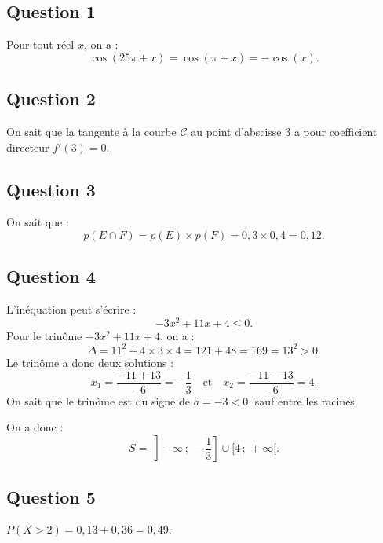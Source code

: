 \subsection*{Question 1}

Pour tout réel \(x\), on a :
\[
\cos(25\pi + x) = \cos(\pi + x) = - \cos(x).
\]

\subsection*{Question 2}

On sait que la tangente à la courbe \(\mathcal{C}\) au point d'abscisse 3 a pour coefficient directeur \(f'(3) = 0\).

\subsection*{Question 3}

On sait que :
\[
p(E \cap F) = p(E) \times p(F) = 0{,}3 \times 0{,}4 = 0{,}12.
\]

\subsection*{Question 4}

L'inéquation peut s'écrire :
\[
-3x^2 + 11x + 4 \leqslant 0.
\]
Pour le trinôme \(-3x^2 + 11x + 4\), on a :
\[
\Delta = 11^2 + 4 \times 3 \times 4 = 121 + 48 = 169 = 13^2 > 0.
\]
Le trinôme a donc deux solutions :
\[
x_1 = \dfrac{-11 + 13}{-6} = -\dfrac{1}{3} \quad \text{et} \quad x_2 = \dfrac{-11 - 13}{-6} = 4.
\]
On sait que le trinôme est du signe de \(a = -3 < 0\), sauf entre les racines.

On a donc :
\[
S = \left]-\infty \,;\, -\dfrac{1}{3} \right] \cup [4 \,;\, +\infty[.
\]

\subsection*{Question 5}

\( P(X > 2) = 0{,}13 + 0{,}36 = 0{,}49 \).
